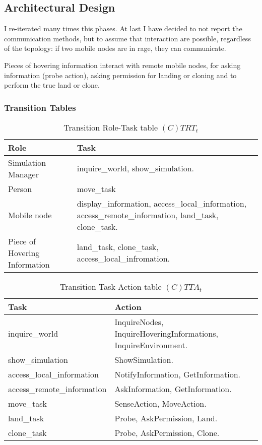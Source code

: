 \subsection{Architectural Design}

I re-iterated many times this phases. At last I have decided to not report the
communication methods, but to assume that interaction are possible, regardless
of the topology: if two mobile nodes are in rage, they can communicate.

Pieces of hovering information interact with remote mobile nodes, for asking
information (probe action), asking permission for landing or cloning and to
perform the true land or clone.

\subsubsection{Transition Tables}

\begin{table}[H]
	\centering
	\begin{tabular}{|p{4cm}|p{8cm}|}
			\hline
			\textbf{Role} & \textbf{Task} \\
			\hline
      Simulation Manager & inquire\_world, show\_simulation.   \\
			\hline
			Person & move\_task \\
			\hline
      Mobile node & display\_information, access\_local\_information,
                    access\_remote\_information, land\_task, clone\_task. \\
			\hline
			Piece of Hovering Information & land\_task, clone\_task, access\_local\_infromation. \\
			\hline
		\end{tabular}
	\caption{Transition Role-Task table $(C)TRT_t$}
	\label{tab:ctrtt}
\end{table}

\begin{table}[H]
	\centering
	\begin{tabular}{|p{4cm}|p{8cm}|}
			\hline
			\textbf{Task} & \textbf{Action} \\
			\hline
			inquire\_world & InquireNodes, InquireHoveringInformations, InquireEnvironment. \\
			\hline
			show\_simulation & ShowSimulation. \\
			\hline
			access\_local\_information & NotifyInformation, GetInformation.\\
			\hline
			access\_remote\_information & AskInformation, GetInformation.\\
			\hline
			move\_task & SenseAction, MoveAction. \\
			\hline
			land\_task & Probe, AskPermission, Land. \\
			\hline
			clone\_task & Probe, AskPermission, Clone. \\
			\hline
		\end{tabular}
	\caption{Transition Task-Action table $(C)TTA_t$}
	\label{tab:cttat}
\end{table}

